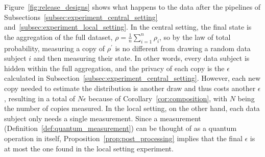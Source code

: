 \documentclass{ieeeaccess}
\begin{document}
Figure~\ref{fig:release_designs} shows what happens to the data after the pipelines of Subsections~\ref{subsec:experiment_central_setting} and~\ref{subsec:experiment_local_setting}. In the central setting, the final state is the aggregation of the full dataset, $\rho = \frac{1}{n}\sum_{i=1}^{n}\rho_i$, so by the law of total probability, measuring a copy of $\rho^{\prime}$ is no different from drawing a random data subject $i$ and then measuring their state. In other words, every data subject is hidden within the full aggregation, and the privacy of each copy is the $\epsilon$ calculated in Subsection~\ref{subsec:experiment_central_setting}. However, each new copy needed to estimate the distribution is another draw and thus costs another $\epsilon$, resulting in a total of $N\epsilon$ because of Corollary~\ref{cor:composition}, with $N$ being the number of copies measured. In the local setting, on the other hand, each data subject only needs a single measurement. Since a measurement (Definition~\ref{def:quantum_measurement}) can be thought of as a quantum operation in itself, Proposition~\ref{prop:post_processing} implies that the final $\epsilon$ is at most the one found in the local setting experiment.
\end{document}
